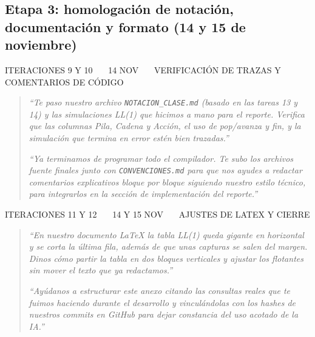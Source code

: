 \documentclass[12pt]{article}
\newcommand{\cmd}[1]{\texttt{\small #1}}
\begin{document}
\subsection*{Etapa 3: homologación de notación, documentación y formato (14 y 15 de noviembre)}

\begin{apartado}{ITERACIONES 9 Y 10 \ \textbullet\ \ 14 NOV \ \textbullet\ \ VERIFICACIÓN DE TRAZAS Y COMENTARIOS DE CÓDIGO}
\begin{quote}
\emph{``Te paso nuestro archivo \cmd{NOTACION\_CLASE.md} (basado en las tareas 13 y 14) y las
simulaciones LL(1) que hicimos a mano para el reporte. Verifica que las columnas Pila, Cadena y
Acción, el uso de pop/avanza y fin, y la simulación que termina en error estén bien trazadas.''}

\emph{``Ya terminamos de programar todo el compilador. Te subo los archivos fuente finales junto
con \cmd{CONVENCIONES.md} para que nos ayudes a redactar comentarios explicativos bloque por bloque
siguiendo nuestro estilo técnico, para integrarlos en la sección de implementación del reporte.''}
\end{quote}
\end{apartado}

\begin{apartado}{ITERACIONES 11 Y 12 \ \textbullet\ \ 14 Y 15 NOV \ \textbullet\ \ AJUSTES DE LATEX Y CIERRE}
\begin{quote}
\emph{``En nuestro documento LaTeX la tabla LL(1) queda gigante en horizontal y se corta la última
fila, además de que unas capturas se salen del margen. Dinos cómo partir la tabla en dos bloques
verticales y ajustar los flotantes sin mover el texto que ya redactamos.''}

\emph{``Ayúdanos a estructurar este anexo citando las consultas reales que te fuimos haciendo
durante el desarrollo y vinculándolas con los hashes de nuestros commits en GitHub para dejar
constancia del uso acotado de la IA.''}
\end{quote}
\end{apartado}
\end{document}
